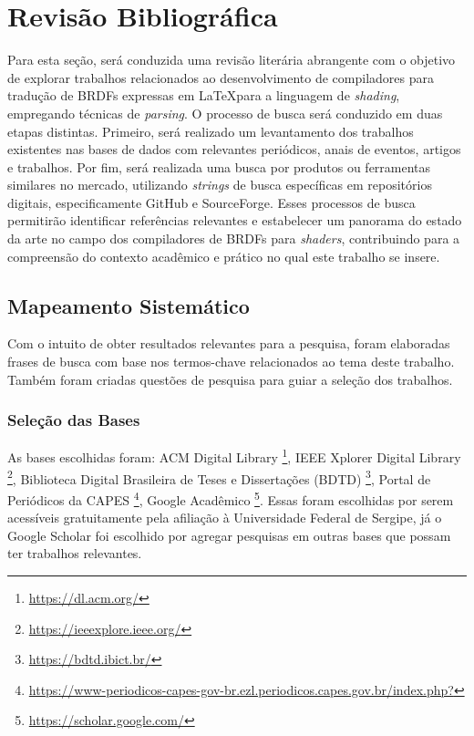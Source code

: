 \documentclass[english, 
               brazil, 
               bsc] %
               {dcomp-abntex2}
\begin{document}
\chapter{Revisão Bibliográfica} \label{revisao}


Para esta seção, será conduzida uma revisão literária abrangente com o objetivo de explorar trabalhos relacionados ao desenvolvimento de compiladores para tradução de BRDFs expressas em \LaTeX  para a linguagem de \textit{shading}, empregando técnicas de \textit{parsing}. O processo de busca será conduzido em duas etapas distintas. Primeiro, será realizado um levantamento dos trabalhos existentes nas bases de dados  com relevantes periódicos, anais de eventos, artigos e trabalhos. Por fim, será realizada uma busca por produtos ou ferramentas similares no mercado, utilizando \textit{strings} de busca específicas em repositórios digitais, especificamente GitHub e SourceForge. Esses processos de busca permitirão identificar referências relevantes e estabelecer um panorama do estado da arte no campo dos compiladores de BRDFs  para \textit{shaders}, contribuindo para a compreensão do contexto acadêmico e prático no qual este trabalho se insere.


\section{Mapeamento Sistemático}


Com o intuito de obter resultados relevantes para a pesquisa, foram elaboradas frases de busca com base nos termos-chave relacionados ao tema deste trabalho. Também foram criadas questões de pesquisa para guiar a seleção dos trabalhos.


\subsection{Seleção das Bases}
As bases escolhidas foram: ACM Digital Library \footnote{\url{https://dl.acm.org/}},  IEEE Xplorer Digital Library \footnote{\url{https://ieeexplore.ieee.org/}},  Biblioteca Digital Brasileira de Teses e Dissertações (BDTD) \footnote{\url{https://bdtd.ibict.br/}}, Portal de Periódicos da CAPES \footnote{\url{https://www-periodicos-capes-gov-br.ezl.periodicos.capes.gov.br/index.php?}},  Google Acadêmico \footnote{\url{https://scholar.google.com/}}. Essas foram escolhidas por serem acessíveis gratuitamente pela afiliação à Universidade Federal de Sergipe, já o Google Scholar foi escolhido por agregar pesquisas em outras bases que possam ter trabalhos relevantes.
\end{document}

